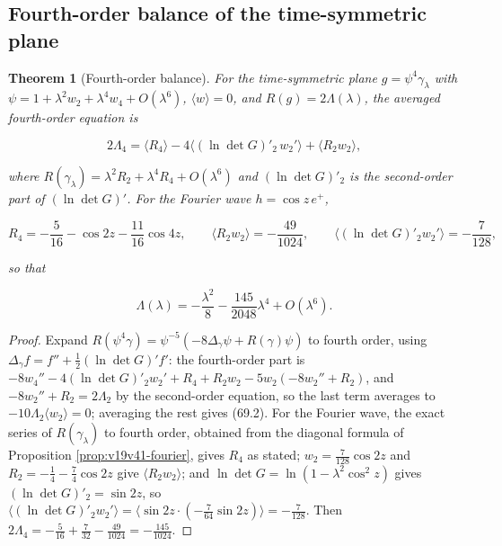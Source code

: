 \documentclass[11pt]{article}
\newtheorem{theorem}{Theorem}[section]
\theoremstyle{remark}
\begin{document}
\subsection{Fourth-order balance of the time-symmetric plane}

\begin{theorem}[Fourth-order balance]
\label{thm:v19v66-fourth}
For the time-symmetric plane \(g=\psi^4\gamma_\lambda\) with
\(\psi=1+\lambda^2w_2+\lambda^4w_4+O(\lambda^6)\), \(\langle w\rangle=0\),
and \(R(g)=2\Lambda(\lambda)\), the averaged fourth-order equation is

\[
 2\Lambda_4=\langle R_4\rangle-4\bigl\langle(\ln\det G)'_2\,w_2'\bigr\rangle
 +\langle R_2w_2\rangle,                                               \tag{69.2}
\]

where \(R(\gamma_\lambda)=\lambda^2R_2+\lambda^4R_4+O(\lambda^6)\) and
\((\ln\det G)'_2\) is the second-order part of \((\ln\det G)'\).  For
the Fourier wave \(h=\cos z\,e^+\),

\[
 R_4=-\frac5{16}-\cos2z-\frac{11}{16}\cos4z,\qquad
 \langle R_2w_2\rangle=-\frac{49}{1024},\qquad
 \bigl\langle(\ln\det G)'_2w_2'\bigr\rangle=-\frac7{128},              \tag{69.3}
\]

so that

\[
 \Lambda(\lambda)=-\frac{\lambda^2}8-\frac{145}{2048}\lambda^4+O(\lambda^6).
                                                                    \tag{69.4}
\]
\end{theorem}

\begin{proof}
Expand \(R(\psi^4\gamma)=\psi^{-5}(-8\Delta_\gamma\psi+R(\gamma)\psi)\)
to fourth order, using \(\Delta_\gamma f=f''+\tfrac12(\ln\det G)'f'\):
the fourth-order part is
\(-8w_4''-4(\ln\det G)'_2w_2'+R_4+R_2w_2-5w_2(-8w_2''+R_2)\), and
\(-8w_2''+R_2=2\Lambda_2\) by the second-order equation, so the last
term averages to \(-10\Lambda_2\langle w_2\rangle=0\); averaging the
rest gives (69.2).  For the Fourier wave, the exact series of
\(R(\gamma_\lambda)\) to fourth order, obtained from the diagonal
formula of Proposition \ref{prop:v19v41-fourier}, gives \(R_4\) as
stated; \(w_2=\tfrac7{128}\cos2z\) and \(R_2=-\tfrac14-\tfrac74\cos2z\)
give \(\langle R_2w_2\rangle\); and
\(\ln\det G=\ln(1-\lambda^2\cos^2z)\) gives
\((\ln\det G)'_2=\sin2z\), so \(\langle(\ln\det G)'_2w_2'\rangle
=\langle\sin2z\cdot(-\tfrac7{64}\sin2z)\rangle=-\tfrac7{128}\).  Then
\(2\Lambda_4=-\tfrac5{16}+\tfrac7{32}-\tfrac{49}{1024}=-\tfrac{145}{1024}\).
\end{proof}
\end{document}

